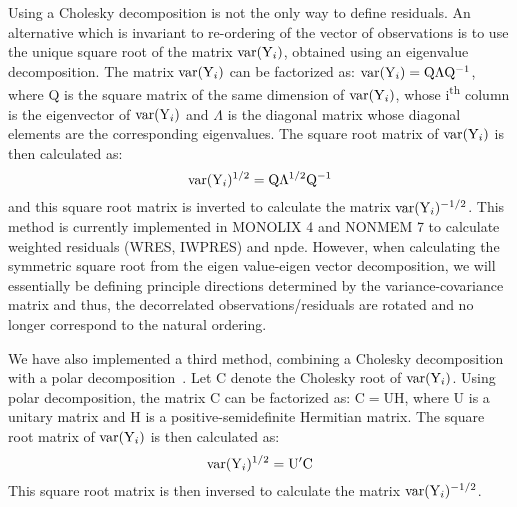 Using a Cholesky decomposition is not the only way to define residuals. An alternative which is invariant to re-ordering of the vector of observations is to use the unique square root of the matrix $\hbox{var}({\rm Y}_{i})$, obtained using an eigenvalue decomposition. The matrix $\hbox{var}({\rm Y}_i)$ can be factorized as: $\hbox{var}({\rm Y}_{i})= \mathrm{Q} \Lambda \mathrm{Q}^{-1}$, where Q is the square matrix of the same dimension of $\hbox{var}({\rm Y}_i)$, whose i\textsuperscript{th} column is the eigenvector of $\hbox{var}({\rm Y}_i)$ and $\Lambda$ is the diagonal matrix whose diagonal elements are the corresponding eigenvalues. The square root matrix of $\hbox{var}({\rm Y}_i)$ is then calculated as: 
$$\hbox{var}({\rm Y}_i)^{1/2} = \mathrm{Q} \Lambda^{1/2} \mathrm{Q}^{-1}$$
and this square root matrix is inverted to calculate the matrix $\hbox{var}({\rm Y}_i)^{-1/2}$. This method is currently implemented in MONOLIX 4 and NONMEM 7 to calculate weighted residuals (WRES, IWPRES) and npde. However, when calculating the symmetric square root from the eigen value-eigen vector decomposition, we will essentially be defining principle directions determined by the variance-covariance matrix and thus, the decorrelated observations/residuals are rotated and no longer correspond to the natural ordering.

We have also implemented a third method, combining a Cholesky decomposition with a polar decomposition~\cite{Higham86}. Let $\mathrm{C}$ denote the Cholesky root of $\hbox{var}({\rm Y}_i)$. Using polar decomposition, the matrix $\mathrm{C}$ can be factorized as: $\mathrm{C} = \mathrm{U} \mathrm{H}$, where U is a unitary matrix and H is a positive-semidefinite Hermitian matrix. The square root matrix of $\hbox{var}({\rm Y}_i)$ is then calculated as: 
$$\hbox{var}({\rm Y}_i)^{1/2} = \mathrm{U}' \mathrm{C}$$
This square root matrix is then inversed to calculate the matrix $\hbox{var}({\rm Y}_i)^{-1/2}$.


